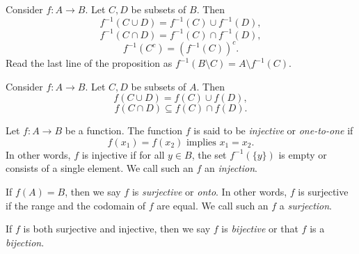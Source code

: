 \documentclass[../main.tex]{subfiles}
\begin{document}
\begin{proposition} \label{prop:inverse_image_properties}
Consider \( f: A \to B \). Let \( C, D \) be subsets of \( B \). Then
\[
f^{-1}(C \cup D) = f^{-1}(C) \cup f^{-1}(D),
\]
\[
f^{-1}(C \cap D) = f^{-1}(C) \cap f^{-1}(D),
\]
\[
f^{-1}(C^c) = (f^{-1}(C))^c.
\]
Read the last line of the proposition as $f^{-1}( B \setminus C) = A \setminus f^{-1} (C)\text{.}$
\end{proposition}


























\begin{proposition} \label{prop:direct_image_properties}
Consider \( f: A \to B \). Let \( C, D \) be subsets of \( A \). Then
\[
f(C \cup D) = f(C) \cup f(D),
\]
\[
f(C \cap D) \subseteq f(C) \cap f(D).
\]
\end{proposition}





















\begin{definition} \label{def:injective_surjective_bijective}
Let \( f: A \to B \) be a function. The function \( f \) is said to be \textit{injective} or \textit{one-to-one} if
\[
f(x_1) = f(x_2) \text{ implies } x_1 = x_2.
\]
In other words, \( f \) is injective if for all \( y \in B \), the set \( f^{-1}(\{y\}) \) is empty or consists of a single element. We call such an \( f \) an \textit{injection}.

If \( f(A) = B \), then we say \( f \) is \textit{surjective} or \textit{onto}. In other words, \( f \) is surjective if the range and the codomain of \( f \) are equal. We call such an \( f \) a \textit{surjection}.

If \( f \) is both surjective and injective, then we say \( f \) is \textit{bijective} or that \( f \) is a \textit{bijection}.
\end{definition}
\end{document}

